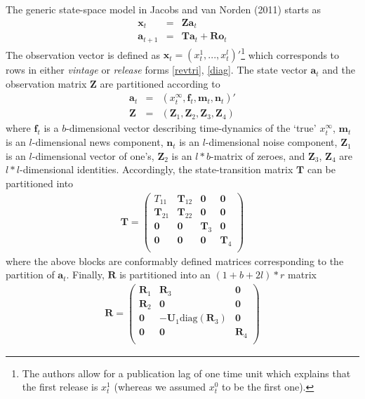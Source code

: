 \documentclass[11pt]{article}
\begin{document}
The generic state-space model in Jacobs and van Norden (2011) starts as
\begin{eqnarray*}
\textbf{x}_t&=&\textbf{Za}_t\\
\textbf{a}_{t+1}&=&\textbf{Ta}_t+\textbf{Ro}_t
\end{eqnarray*}
The observation vector is defined as $\textbf{x}_t=(x_t^1,...,x_t^{l})'$\footnote{The authors allow for a publication lag of one time unit which explains that the first release is $x_t^1$ (whereas we assumed $x_t^0$ to be the first one).} which corresponds to rows in either \emph{vintage} or \emph{release} forms \ref{revtri}, \ref{diag}. The state vector $\textbf{a}_t$ and the observation matrix $\textbf{Z}$ are partitioned according to
\begin{eqnarray*}
\textbf{a}_t&=&(x_t^{\infty},\textbf{f}_t,\textbf{m}_t,\textbf{n}_t)'\\
\textbf{Z}&=&(\textbf{Z}_1,\textbf{Z}_2,\textbf{Z}_3,\textbf{Z}_4)
\end{eqnarray*}
where $\textbf{f}_t$ is a $b$-dimensional vector describing time-dynamics of the `true' $x_t^\infty$, $\textbf{m}_t$ is an $l$-dimensional news component, $\textbf{n}_t$ is an $l$-dimensional noise component, $\textbf{Z}_1$ is an $l$-dimensional vector of one's, $\textbf{Z}_2$ is an $l*b$-matrix of zeroes, and $\textbf{Z}_3$, $\textbf{Z}_4$ are $l*l$-dimensional identities. Accordingly, the state-transition matrix $\textbf{T}$ can be partitioned into
\begin{eqnarray*}
\textbf{T}=\left(
             \begin{array}{cccc}
               T_{11} & \textbf{T}_{12} & \textbf{0} & \textbf{0} \\
               \textbf{T}_{21} & \textbf{T}_{22} & \textbf{0} & \textbf{0} \\
               \textbf{0} & \textbf{0} & \textbf{T}_3 & \textbf{0} \\
               \textbf{0} & \textbf{0} & \textbf{0} & \textbf{T}_4 \\
             \end{array}
           \right)
\end{eqnarray*}
where the above blocks are conformably defined matrices corresponding to the partition of $\textbf{a}_t$. Finally, $\textbf{R}$ is partitioned into an $(1+b+2l)*r$ matrix
\begin{eqnarray*}
\textbf{R}=\left(
             \begin{array}{ccc}
               \textbf{R}_{1} & \textbf{R}_{3} & \textbf{0}  \\
               \textbf{R}_{2} &  \textbf{0} & \textbf{0} \\
               \textbf{0} &  -\textbf{U}_1\textrm{diag}(\textbf{R}_3) & \textbf{0} \\
               \textbf{0} & \textbf{0} &  \textbf{R}_4 \\
             \end{array}
           \right)
\end{eqnarray*}
\end{document}
